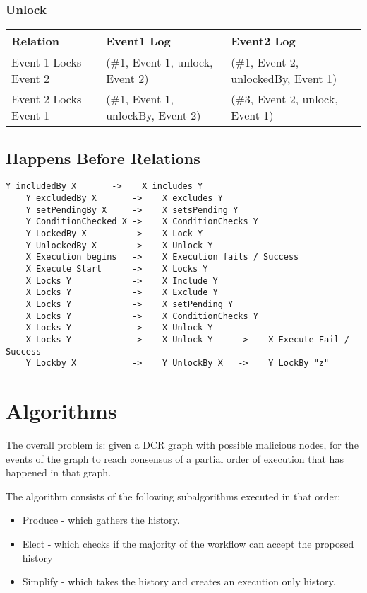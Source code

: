 \subsection{Unlock}
\begin{tabularx}{\textwidth}{|*{3}{>{\raggedright\arraybackslash}X|}}
  \hline
  Relation & Event1 Log & Event2 Log \\
  \hline
  Event 1 Locks Event 2 & (\#1, Event 1, unlock, Event 2) & (\#1, Event 2, unlockedBy, Event 1) \\
  \hline
  Event 2 Locks Event 1 & (\#1, Event 1, unlockBy, Event 2) & (\#3, Event 2, unlock, Event 1) \\
  \hline
\end{tabularx}

\section{Happens Before Relations}

\begin{lstlisting}[breaklines=true]
    Y includedBy X       ->    X includes Y
    Y excludedBy X       ->    X excludes Y
    Y setPendingBy X     ->    X setsPending Y
    Y ConditionChecked X ->    X ConditionChecks Y
    Y LockedBy X         ->    X Lock Y
    Y UnlockedBy X       ->    X Unlock Y
    X Execution begins   ->    X Execution fails / Success
    X Execute Start      ->    X Locks Y
    X Locks Y            ->    X Include Y
    X Locks Y            ->    X Exclude Y
    X Locks Y            ->    X setPending Y
    X Locks Y            ->    X ConditionChecks Y
    X Locks Y            ->    X Unlock Y
    X Locks Y            ->    X Unlock Y     ->    X Execute Fail / Success
    Y Lockby X           ->    Y UnlockBy X   ->    Y LockBy "z"
\end{lstlisting}

\chapter{Algorithms}
The overall problem is: given a DCR graph with possible malicious nodes, for the events of the graph to reach consensus of a partial order of execution that has happened in that graph.

The algorithm consists of the following subalgorithms executed in that order:
\begin{itemize}
    \item Produce - which gathers the history.
    \item Elect - which checks if the majority of the workflow can accept the proposed history
    \item Simplify - which takes the history and creates an execution only history.
\end{itemize}

